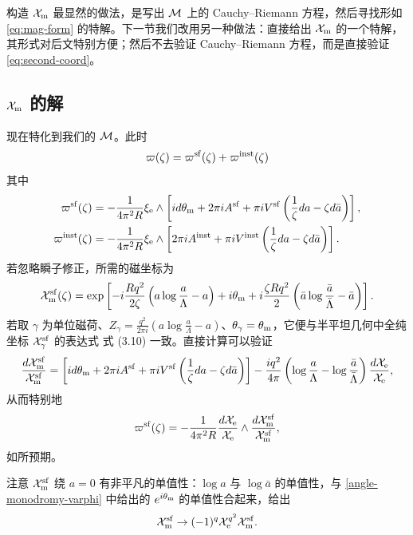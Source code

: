 构造 $\mathcal{X}_{\mathrm{m}}$ 最显然的做法，是写出 $\mathcal{M}$ 上的 Cauchy–Riemann 方程，然后寻找形如 \eqref{eq:mag-form} 的特解。下一节我们改用另一种做法：直接给出 $\mathcal{X}_{\mathrm{m}}$ 的一个特解，其形式对后文特别方便；然后不去验证 Cauchy–Riemann 方程，而是直接验证 \eqref{eq:second-coord}。

\subsection{$\mathcal{X}_{\mathrm{m}}$ 的解}
\label{sec:solving-xmagn}

现在特化到我们的 $\mathcal{M}$。此时
\begin{equation}
\varpi(\zeta) = \varpi^{\mathrm{sf}}(\zeta) + \varpi^{\mathrm{inst}}(\zeta)
\end{equation}
其中
\begin{align}
\varpi^{\mathrm{sf}}(\zeta) &= - \frac{1}{4 \pi^2 R} \xi_{\mathrm{e}} \wedge \left[ i d \theta_{\mathrm{m}} + 2 \pi i A^{\mathrm{sf}} + \pi i V^{\mathrm{sf}} \left(\frac{1}{ \zeta} da -  \zeta d\bar{a}\right) \right],  \\
\varpi^{\mathrm{inst}}(\zeta) &= - \frac{1}{4 \pi^2 R} \xi_{\mathrm{e}} \wedge \left[ 2 \pi i A^{\mathrm{inst}} +
\pi i V^{\mathrm{inst}} \left(\frac{1}{\zeta} da -  \zeta d\bar{a}\right)\right]. \label{eq:instanton-corrections-Omega}
\end{align}
若忽略瞬子修正，所需的磁坐标为
\begin{equation} \mathcal{X}_{\mathrm{m}}^{\mathrm{sf}}(\zeta)= \exp\left[-i \frac{R q^2}{2 \zeta} \left(a
\log\frac{a}{\Lambda} -a\right) + i \theta_{\mathrm{m}} + i \frac{\zeta R q^2}{2} \left(\bar a
\log\frac{\bar a}{\bar \Lambda} - \bar a\right)\right].
\end{equation}
若取 $\gamma$ 为单位磁荷、$Z_\gamma = \frac{q^2}{2 \pi i} (a \log \frac{a}{\Lambda} - a)$、$\theta_\gamma = \theta_{\mathrm{m}}$，它便与半平坦几何中全纯坐标 $\mathcal{X}^{\mathrm{sf}}_\gamma$ 的表达式 式 (3.10) 一致。直接计算可以验证
\begin{equation}
\frac{d \mathcal{X}^{\mathrm{sf}}_{\mathrm{m}}}{\mathcal{X}^{\mathrm{sf}}_{\mathrm{m}}} = \left[ i d \theta_{\mathrm{m}} + 2 \pi i A^{\mathrm{sf}} + \pi i V^{\mathrm{sf}} \left(\frac{1}{\zeta} da -  \zeta d\bar{a}\right) \right] - \frac{i q^2}{4 \pi}\left( \log \frac{a}{\Lambda} - \log \frac{\bar{a}}{\bar{\Lambda}} \right) \frac{d \mathcal{X}_{\mathrm{e}}}{\mathcal{X}_{\mathrm{e}}},
\end{equation}
从而特别地
\begin{equation} \label{eq:Omega-sf-repeat}
\varpi^{\mathrm{sf}}(\zeta) = - \frac{1}{4 \pi^2 R} \frac{d\mathcal{X}_{\mathrm{e}}}{\mathcal{X}_{\mathrm{e}}} \wedge \frac{d\mathcal{X}_{\mathrm{m}}^{\mathrm{sf}}}{\mathcal{X}_{\mathrm{m}}^{\mathrm{sf}}},
\end{equation}
如所预期。%

注意 $\mathcal{X}_{\mathrm{m}}^{\mathrm{sf}}$ 绕 $a=0$ 有非平凡的单值性：$\log a$ 与 $\log \bar a$ 的单值性，与 \eqref{angle-monodromy-varphi} 中给出的 $e^{i \theta_{\mathrm{m}}}$ 的单值性合起来，给出
\begin{equation}\label{eq:mono2}
\mathcal{X}_{\mathrm{m}}^{\mathrm{sf}} \to (-1)^q \mathcal{X}_{\mathrm{e}}^{q^2} \mathcal{X}_{\mathrm{m}}^{\mathrm{sf}}.
\end{equation}

